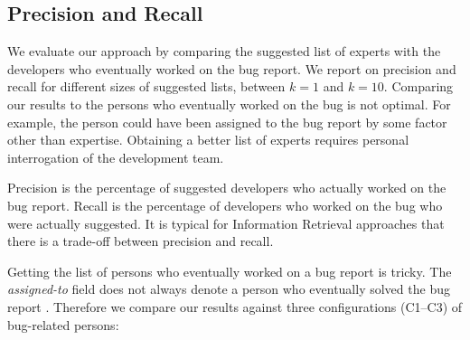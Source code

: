 

\subsection{Precision and Recall}

We evaluate our approach by comparing the suggested list of experts with the developers who eventually worked on the bug report. We report on precision and recall for different sizes of suggested lists, between $k = 1$ and $k = 10$. Comparing our results to the persons who eventually worked on the bug is not optimal. For example, the person could have been assigned to the bug report by some factor other than expertise. Obtaining a better list of experts requires personal interrogation of the development team.

Precision is the percentage of suggested developers who actually worked on the bug report. Recall is the percentage of developers who worked on the bug who were actually suggested. It is typical for Information Retrieval approaches that there is a trade-off between precision and recall.

Getting the list of persons who eventually worked on a bug report is tricky. The \emph{assigned-to} field does not always denote a person who eventually solved the bug report \cite{Cubr04b, Anvi06a, Anvik07}. Therefore we compare our results against three configurations (C1--C3) of bug-related persons:

